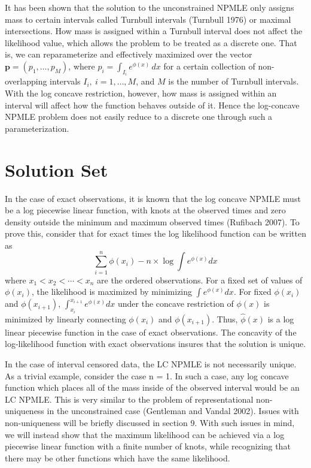 \documentclass[12pt]{article}
\numberwithin{equation}{section}
\begin{document}
	It has been shown that the solution to the unconstrained NPMLE only assigns mass to certain intervals called Turnbull intervals (Turnbull 1976) or maximal intersections. How mass is assigned within a Turnbull interval does not affect the likelihood value, which allows the problem to be treated as a discrete one. That is, we can reparameterize and effectively maximized over the vector $\mathbf{p}=(p_1, \ldots, p_M)$, where $p_i = \int_{I_i} e^ { \phi(x) } \,dx$ for a certain collection of non-overlapping intervals $I_i,\ i=1,\ldots, M$, and $M$ is the number of Turnbull intervals. With the log concave restriction, however, how mass is assigned within an interval will affect how the function behaves outside of it.  Hence the log-concave NPMLE problem does not easily reduce to a discrete one through such a parameterization.
		
		
{\section{Solution Set}}


	In the case of exact observations, it is known that the log concave NPMLE must be a log piecewise linear function, with knots at the observed times and zero density outside the minimum and maximum observed times (Rufibach 2007). To prove this, consider that for exact times the log likelihood function can be written as	
	\[ \displaystyle \sum_{i = 1}^n \phi(x_i) - n \times \log \int e^{\phi(x)} dx
	\]
where $x_1<x_2<\cdots<x_n$ are the ordered observations. For a fixed set of values of $\phi(x_i)$, the likelihood is maximized by minimizing $\int e^{\phi(x)} dx$. For fixed $\phi(x_i)$ and $\phi(x_{i+1})$, $\int_{x_i}^{x_{i+1}} e^{\phi(x)}dx$ under the concave restriction of $\phi(x)$ is minimized by linearly connecting $\phi(x_i)$ and $\phi(x_{i+1})$. Thus, $\hat \phi(x)$ is a log linear piecewise function in the case of exact observations. The concavity of the log-likelihood function with exact observations insures that the solution is unique.
		
	In the case of interval censored data, the LC NPMLE is not necessarily unique. As a trivial example, consider the case n = 1. In such a case, any log concave function which places all of the mass inside of the observed interval would be an LC NPMLE. This is very similar to the problem of representational non-uniqueness in the unconstrained case (Gentleman and Vandal 2002). Issues with non-uniqueness will be briefly discussed in section 9. With such issues in mind, we will instead show that the maximum likelihood can be achieved via a log piecewise linear function with a finite number of knots, while recognizing that there may be other functions which have the same likelihood. 
	
\end{document}
